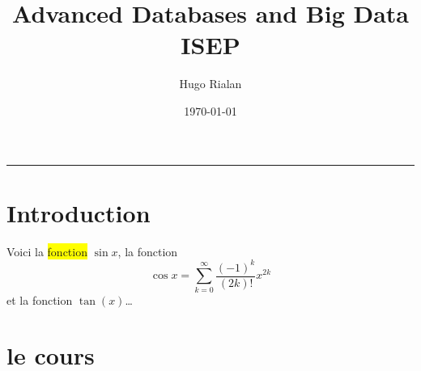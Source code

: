 \documentclass[12pt, oneside]{article}
\title{Advanced Databases and Big Data \\  ISEP}
\author{Hugo Rialan}
\date{\today}
\begin{document}
\maketitle
\hrule height 0.5mm


\section{Introduction}

Voici la \colorbox{yellow}{fonction} $\sin x$,
la fonction \[\cos x=\sum_{k=0}^{\infty}\frac{(-1)^k}{(2k)!}x^{2k}\]
et la fonction $\tan (x)$\ldots
  
\section{le cours}
\end{document}
